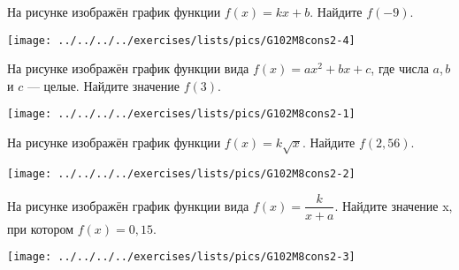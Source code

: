 \begin{consultation}
	\begin{listofex}
	\item  
		\begin{minipage}[t]{\bodywidth}
			На рисунке изображён график функции \( f(x)=kx + b \). Найдите \( f (-9) \).
		\end{minipage}
		\hspace{0.02\linewidth}
		\begin{minipage}[t]{\picwidth}
			\texttt{[image: ../../../../exercises/lists/pics/G102M8cons2-4]}
		\end{minipage}
	\item 
		\begin{minipage}[t]{\bodywidth}
			На рисунке изображён график функции вида \( f(x)=ax^{2}+bx+c \), где числа \( a \), \( b \) и \( c \)  — целые. Найдите значение \( f(3) \).
		\end{minipage}
		\hspace{0.02\linewidth}
		\begin{minipage}[t]{\picwidth}
			\texttt{[image: ../../../../exercises/lists/pics/G102M8cons2-1]}
		\end{minipage}
	\item 
		\begin{minipage}[t]{\bodywidth}
			На рисунке изображён график функции \( f (x)=k\sqrt{x} \). Найдите \( f(2,56) \).
		\end{minipage}
		\hspace{0.02\linewidth}
		\begin{minipage}[t]{\picwidth}
			\texttt{[image: ../../../../exercises/lists/pics/G102M8cons2-2]}
		\end{minipage}
	\item 
		\begin{minipage}[t]{\bodywidth}
			На рисунке изображён график функции вида \( f(x)=  \dfrac{k}{x+a} \).  Найдите значение x, при котором \( f (x) =0,15 \).
		\end{minipage}
		\hspace{0.02\linewidth}
		\begin{minipage}[t]{\picwidth}
			\texttt{[image: ../../../../exercises/lists/pics/G102M8cons2-3]}
		\end{minipage}


\end{listofex}
\end{consultation}
